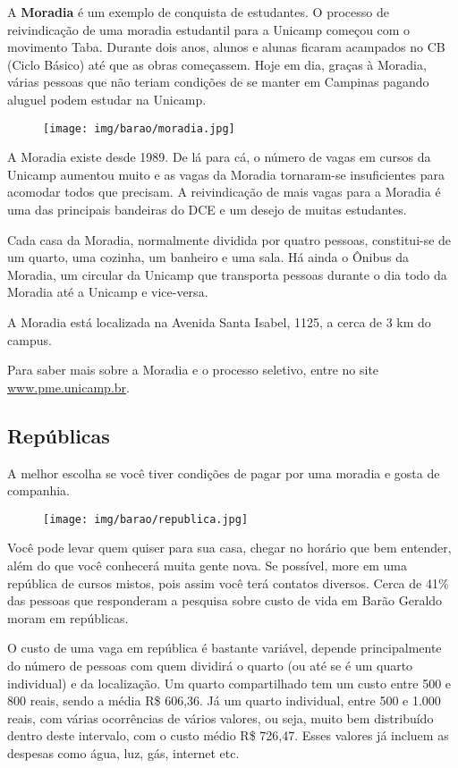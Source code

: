 A \textbf{Moradia} é um exemplo de conquista de estudantes. O processo de
reivindicação de uma moradia estudantil para a Unicamp começou com o movimento
Taba. Durante dois anos, alunos e alunas ficaram acampados no CB (Ciclo Básico)
até que as obras começassem. Hoje em dia, graças à Moradia, várias pessoas que
não teriam condições de se manter em Campinas pagando aluguel podem estudar na
Unicamp.

\begin{figure}[h!]
  \centering
  \texttt{[image: img/barao/moradia.jpg]}
\end{figure}

A Moradia existe desde 1989. De lá para cá, o número de vagas em cursos da
Unicamp aumentou muito e as vagas da Moradia tornaram-se insuficientes para
acomodar todos que precisam. A reivindicação de mais vagas para a Moradia é uma
das principais bandeiras do DCE e um desejo de muitas estudantes.

Cada casa da Moradia, normalmente dividida por quatro pessoas, constitui-se de
um quarto, uma cozinha, um banheiro e uma sala. Há ainda o Ônibus da Moradia,
um circular da Unicamp que transporta pessoas durante o dia todo da Moradia até
a Unicamp e vice-versa.

A Moradia está localizada na Avenida Santa Isabel, 1125, a cerca de 3 km do
campus.

Para saber mais sobre a Moradia e o processo seletivo, entre no site
\url{www.pme.unicamp.br}.

\subsection{Repúblicas}

A melhor escolha se você tiver condições de pagar por uma moradia e gosta de
companhia.

\begin{figure}[h!]
  \centering
  \texttt{[image: img/barao/republica.jpg]}
\end{figure}

Você pode levar quem quiser para sua casa, chegar no horário que bem entender,
além do que você conhecerá muita gente nova. Se possível, more em uma república
de cursos mistos, pois assim você terá contatos diversos. Cerca de 41\% das
pessoas que responderam a pesquisa sobre custo de vida em Barão Geraldo moram
em repúblicas.

O custo de uma vaga em república é bastante variável, depende principalmente do
número de pessoas com quem dividirá o quarto (ou até se é um quarto individual)
e da localização. Um quarto compartilhado tem um custo entre 500 e 800 reais,
sendo a média R\$ 606,36. Já um quarto individual, entre 500 e 1.000 reais,
com várias ocorrências de vários valores, ou seja, muito bem distribuído dentro
deste intervalo, com o custo médio R\$ 726,47. Esses valores já incluem as
despesas como água, luz, gás, internet etc.

